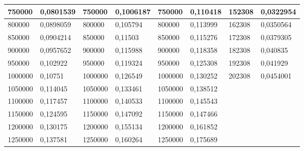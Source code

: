 \documentclass[11pt]{article}
\begin{document}
\begin{table}[!ht]
\begin{tabular}{|l|l|l|l|l|l|l|l|}
        750000 & 0,0801539 & 750000 & 0,1006187 & 750000 & 0,110418 & 152308 & 0,0322954 \\ \hline
        800000 & 0,0898059 & 800000 & 0,105794 & 800000 & 0,113999 & 162308 & 0,0350564 \\ \hline
        850000 & 0,0904214 & 850000 & 0,11503 & 850000 & 0,115276 & 172308 & 0,0379305 \\ \hline
        900000 & 0,0957652 & 900000 & 0,115988 & 900000 & 0,118358 & 182308 & 0,040835 \\ \hline
        950000 & 0,102922 & 950000 & 0,119324 & 950000 & 0,125308 & 192308 & 0,041929 \\ \hline
        1000000 & 0,10751 & 1000000 & 0,126549 & 1000000 & 0,130252 & 202308 & 0,0454001 \\ \hline
        1050000 & 0,114045 & 1050000 & 0,133461 & 1050000 & 0,138512 & ~ & ~ \\ \hline
        1100000 & 0,117457 & 1100000 & 0,140533 & 1100000 & 0,145543 & ~ & ~ \\ \hline
        1150000 & 0,124595 & 1150000 & 0,147092 & 1150000 & 0,147466 & ~ & ~ \\ \hline
        1200000 & 0,130175 & 1200000 & 0,155134 & 1200000 & 0,161852 & ~ & ~ \\ \hline
        1250000 & 0,137581 & 1250000 & 0,160264 & 1250000 & 0,175689 & ~ & \\\hline
    \end{tabular}
\end{table}
\end{document}
